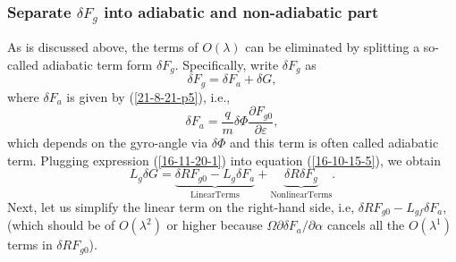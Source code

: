 \documentclass{llncs}
\newcommand{\tmop}[1]{\ensuremath{\operatorname{#1}}}
\begin{document}
\subsubsection{Separate $\delta F_g$ into adiabatic and non-adiabatic part}

As is discussed above, the terms of $O (\lambda)$ can be eliminated by
splitting a so-called adiabatic term form $\delta F_g$. Specifically, write
$\delta F_g$ as
\begin{equation}
  \label{16-11-20-1} \delta F_g = \delta F_a + \delta G,
\end{equation}
where $\delta F_a$ is given by (\ref{21-8-21-p5}), i.e.,
\begin{equation}
  \label{16-11-7-1} \delta F_a = \frac{q}{m} \delta \Phi \frac{\partial F_{g
  0}}{\partial \varepsilon},
\end{equation}
which depends on the gyro-angle via $\delta \Phi$ and this term is often
called adiabatic term. Plugging expression (\ref{16-11-20-1}) into equation
(\ref{16-10-15-5}), we obtain
\begin{equation}
  \label{16-10-14-1} L_g \delta G = \underbrace{\delta R F_{g 0} - L_g \delta
  F_a}_{\tmop{LinearTerms}} + \underbrace{\delta R \delta
  F_g}_{\tmop{NonlinearTerms}} .
\end{equation}
Next, let us simplify the linear term on the right-hand side, i.e, $\delta R
F_{g 0} - L_{g f} \delta F_a$, (which should be of $O (\lambda^2)$ or higher
because $\Omega \partial \delta F_a / \partial \alpha$ cancels all the $O
(\lambda^1)$ terms in $\delta R F_{g 0}$).
\end{document}
